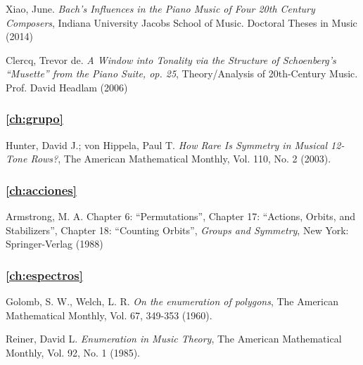 \begin{thebibliography}{00}
			{\sc Xiao, June.} 
			\textit{Bach’s Influences in the Piano Music of Four 20th Century Composers},
			Indiana University Jacobs School of Music.
			Doctoral Theses in Music
			(2014)
			
			{\sc Clercq, Trevor de.} 
			\textit{A Window into Tonality via the Structure of Schoenberg's ``Musette'' from the Piano Suite, op. 25},
			Theory/Analysis of 20th-Century Music.
			Prof. David Headlam
			(2006)
			
			\subsubsection*{\autoref{ch:grupo}}			
			
			{\sc Hunter, David J.; von Hippela, Paul T.}
			\textit{How Rare Is Symmetry in Musical 12-Tone Rows?},
			The American Mathematical Monthly, Vol. 110, No. 2
			(2003).
			
			\subsubsection*{\autoref{ch:acciones}}
			
			{\sc Armstrong, M. A.} Chapter 6: “Permutations”, Chapter 17: “Actions, Orbits, and Stabilizers”, Chapter 18: “Counting Orbits”,
			\textit{Groups and Symmetry},
			New York: Springer-Verlag
			(1988)
			
			\subsubsection*{\autoref{ch:espectros}}
			
			{\sc Golomb, S. W., Welch, L. R.}
			\textit{On the enumeration of polygons},
			The American Mathematical Monthly, Vol. 67, 349-353
			(1960).
			
			{\sc Reiner, David L.}
			\textit{Enumeration in Music Theory},
			The American Mathematical Monthly, Vol. 92, No. 1
			(1985).
			
%			
			

\end{thebibliography}
